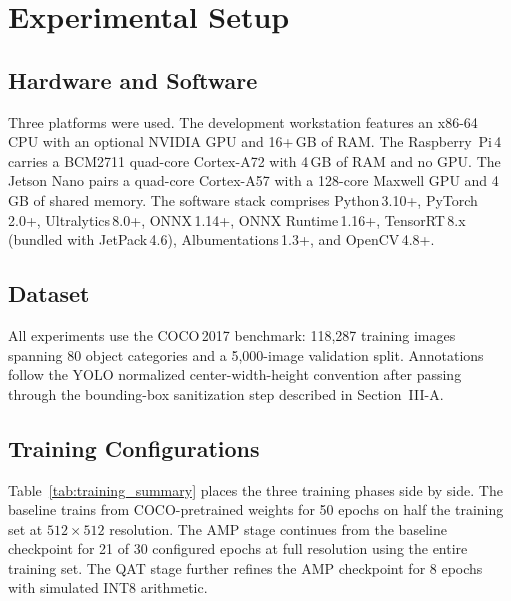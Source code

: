 \documentclass[conference]{IEEEtran}
\begin{document}

\section{Experimental Setup}

\subsection{Hardware and Software}

Three platforms were used. The development workstation features an x86-64 CPU with an optional NVIDIA GPU and 16+\,GB of RAM. The Raspberry~Pi\,4 carries a BCM2711 quad-core Cortex-A72 with 4\,GB of RAM and no GPU. The Jetson Nano pairs a quad-core Cortex-A57 with a 128-core Maxwell GPU and 4\,GB of shared memory. The software stack comprises Python\,3.10+, PyTorch\,2.0+, Ultralytics\,8.0+, ONNX\,1.14+, ONNX Runtime\,1.16+, TensorRT\,8.x (bundled with JetPack\,4.6), Albumentations\,1.3+, and OpenCV\,4.8+.

\subsection{Dataset}

All experiments use the COCO\,2017 benchmark: 118{,}287 training images spanning 80 object categories and a 5{,}000-image validation split. Annotations follow the YOLO normalized center-width-height convention after passing through the bounding-box sanitization step described in Section~III-A.

\subsection{Training Configurations}

Table~\ref{tab:training_summary} places the three training phases side by side. The baseline trains from COCO-pretrained weights for 50 epochs on half the training set at $512{\times}512$ resolution. The AMP stage continues from the baseline checkpoint for 21 of 30 configured epochs at full resolution using the entire training set. The QAT stage further refines the AMP checkpoint for 8 epochs with simulated INT8 arithmetic.
\end{document}
